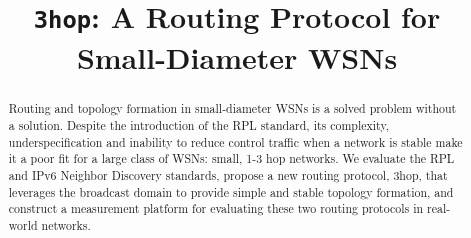 \documentclass[conference]{IEEEtran}
\begin{document}
\title{\texttt{3hop}: A Routing Protocol for Small-Diameter WSNs}

\author{
\and
{}
}

\maketitle

\begin{abstract}
Routing and topology formation in small-diameter WSNs is a solved problem without a solution.
Despite the introduction of the RPL standard, its complexity, underspecification and inability to reduce control traffic when a network is stable make it a poor fit for a large class of WSNs: small, 1-3 hop networks.
We evaluate the RPL and IPv6 Neighbor Discovery standards, propose a new routing protocol, 3hop, that leverages the broadcast domain to provide simple and stable topology formation, and construct a measurement platform for evaluating these two routing protocols in real-world networks.
\end{abstract}

















\end{document}
